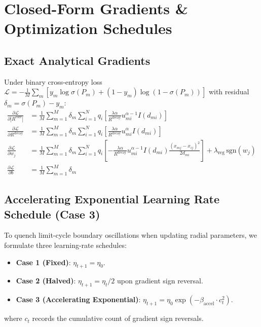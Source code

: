 \documentclass[11pt,a4paper]{article}
\begin{document}
\section{Closed-Form Gradients \& Optimization Schedules}

\subsection{Exact Analytical Gradients}
Under binary cross-entropy loss $\mathcal{L} = -\frac{1}{M}\sum_m [y_m \log \sigma(P_m) + (1-y_m)\log(1-\sigma(P_m))]$ with residual $\delta_m = \sigma(P_m) - y_m$:
\begin{align}
\frac{\partial \mathcal{L}}{\partial |R^{\mathrm{core}}|} &= \frac{1}{M}\sum_{m=1}^{M} \delta_m \sum_{i=1}^{N} q_i \left[ \frac{\lambda \alpha}{R^{\mathrm{decay}}} u_{mi}^{\alpha-1} I(d_{mi}) \right] \\
\frac{\partial \mathcal{L}}{\partial R^{\mathrm{decay}}} &= \frac{1}{M}\sum_{m=1}^{M} \delta_m \sum_{i=1}^{N} q_i \left[ \frac{\lambda \alpha}{R^{\mathrm{decay}}} u_{mi}^{\alpha} I(d_{mi}) \right] \\
\frac{\partial \mathcal{L}}{\partial w_j} &= \frac{1}{M}\sum_{m=1}^{M} \delta_m \sum_{i=1}^{N} q_i \left[ -\frac{\lambda \alpha}{R^{\mathrm{decay}}} u_{mi}^{\alpha-1} I(d_{mi}) \frac{(x_{mj} - x_{ij})^2}{2 d_{mi}} \right] + \lambda_{\mathrm{reg}}\,\mathrm{sgn}(w_j) \\
\frac{\partial \mathcal{L}}{\partial b} &= \frac{1}{M}\sum_{m=1}^{M} \delta_m
\end{align}

\subsection{Accelerating Exponential Learning Rate Schedule (Case 3)}
To quench limit-cycle boundary oscillations when updating radial parameters, we formulate three learning-rate schedules:
\begin{itemize}
    \item \textbf{Case 1 (Fixed)}: $\eta_{t+1} = \eta_0$.
    \item \textbf{Case 2 (Halved)}: $\eta_{t+1} = \eta_t / 2$ upon gradient sign reversal.
    \item \textbf{Case 3 (Accelerating Exponential)}: $\eta_{t+1} = \eta_0 \exp(-\beta_{\mathrm{accel}} \cdot c_t^2)$.
\end{itemize}
where $c_t$ records the cumulative count of gradient sign reversals.
\end{document}
